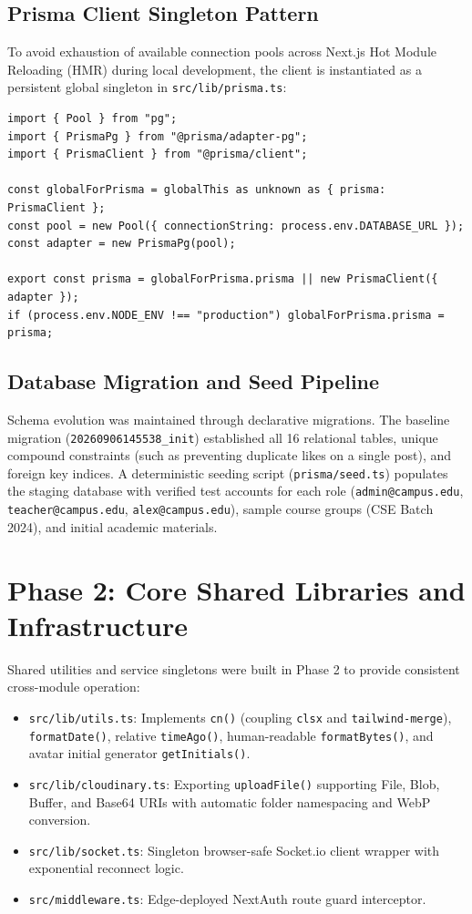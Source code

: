 \documentclass[12pt, a4paper, oneside]{report}
\begin{document}
\subsection{Prisma Client Singleton Pattern}
To avoid exhaustion of available connection pools across Next.js Hot Module Reloading (HMR) during local development, the client is instantiated as a persistent global singleton in \texttt{src/lib/prisma.ts}:
{\small
\begin{verbatim}
import { Pool } from "pg";
import { PrismaPg } from "@prisma/adapter-pg";
import { PrismaClient } from "@prisma/client";

const globalForPrisma = globalThis as unknown as { prisma: PrismaClient };
const pool = new Pool({ connectionString: process.env.DATABASE_URL });
const adapter = new PrismaPg(pool);

export const prisma = globalForPrisma.prisma || new PrismaClient({ adapter });
if (process.env.NODE_ENV !== "production") globalForPrisma.prisma = prisma;
\end{verbatim}
}

\subsection{Database Migration and Seed Pipeline}
Schema evolution was maintained through declarative migrations. The baseline migration (\texttt{20260906145538\_init}) established all 16 relational tables, unique compound constraints (such as preventing duplicate likes on a single post), and foreign key indices. A deterministic seeding script (\texttt{prisma/seed.ts}) populates the staging database with verified test accounts for each role (\texttt{admin@campus.edu}, \texttt{teacher@campus.edu}, \texttt{alex@campus.edu}), sample course groups (CSE Batch 2024), and initial academic materials.

\section{Phase 2: Core Shared Libraries and Infrastructure}
Shared utilities and service singletons were built in Phase 2 to provide consistent cross-module operation:
\begin{itemize}[leftmargin=0.7cm]
    \item \texttt{src/lib/utils.ts}: Implements \texttt{cn()} (coupling \texttt{clsx} and \texttt{tailwind-merge}), \texttt{formatDate()}, relative \texttt{timeAgo()}, human-readable \texttt{formatBytes()}, and avatar initial generator \texttt{getInitials()}.
    \item \texttt{src/lib/cloudinary.ts}: Exporting \texttt{uploadFile()} supporting File, Blob, Buffer, and Base64 URIs with automatic folder namespacing and WebP conversion.
    \item \texttt{src/lib/socket.ts}: Singleton browser-safe Socket.io client wrapper with exponential reconnect logic.
    \item \texttt{src/middleware.ts}: Edge-deployed NextAuth route guard interceptor.
\end{itemize}
\end{document}
